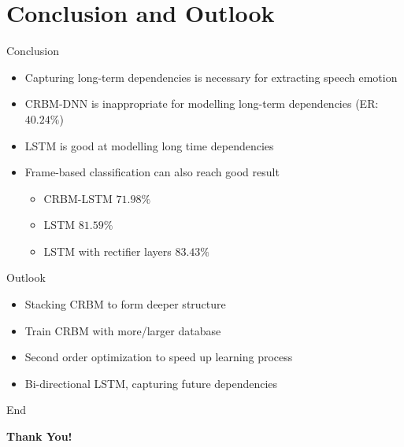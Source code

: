 \section{Conclusion and Outlook}
      \begin{frame}[t]{Conclusion}
	  \begin{itemize}
	  \itemsep10pt
	  \item<1-> Capturing long-term dependencies is necessary for extracting speech emotion
	  \item<2-> CRBM-DNN is inappropriate for modelling long-term dependencies (ER: $40.24\%$)
	  \item<2-> LSTM is good at modelling long time dependencies
	  \item<3-> Frame-based classification can also reach good result
		\only<3->
		{\vspace{5mm}
		\begin{itemize}
		 \itemsep10pt
		 \item CRBM-LSTM $71.98\%$
		 \item LSTM $81.59\%$
		 \item LSTM with rectifier layers $83.43\%$
		\end{itemize}
		}
	  \end{itemize}
	  
      \end{frame}

%       
      \begin{frame}[t]{Outlook}
	  \begin{itemize}
	   \itemsep15pt
	   \item Stacking CRBM to form deeper structure
	   \item Train CRBM with more/larger database 
	   \item Second order optimization to speed up learning process
	   \item Bi-directional LSTM, capturing future dependencies
	  \end{itemize}

      \end{frame}

      \begin{frame}{End}
	\begin{minipage}[c]{\linewidth}
	\centering
	\textbf{\Huge Thank You!}
	\end{minipage}
      \end{frame}



 
